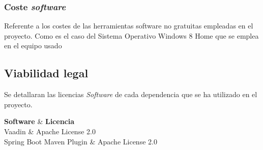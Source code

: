 \subsubsection{Coste \emph{software}}
Referente a los costes de las herramientas software no gratuitas empleadas en el proyecto. Como es el caso del Sistema Operativo Windows 8 Home que se emplea en el equipo usado

\subsection{Viabilidad legal}
Se detallaran las licencias \emph{Software} de cada dependencia que se ha utilizado en el proyecto.

{\textbf{Software} & \textbf{Licencia} \\}{
	Vaadin & Apache License 2.0 \\
	Spring Boot Maven Plugin & Apache License 2.0 \\	
}